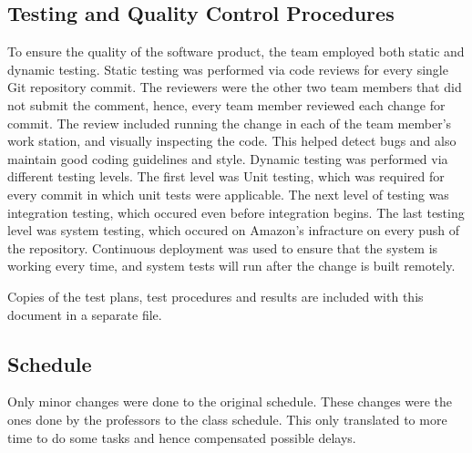\subsection{Testing and Quality Control Procedures}

To ensure the quality of the software product, the team employed both static
and dynamic testing. Static testing was performed via code reviews for every
single Git repository commit. The reviewers were the other two team members
that did not submit the comment, hence, every team member reviewed each change
for commit. The review included running the change in each of the team
member's work station, and visually inspecting the code. This helped detect
bugs and also maintain good coding guidelines and style. Dynamic testing was
performed via different testing levels. The first level was Unit testing,
which was required for every commit in which unit tests were applicable. The next level of testing was integration testing, which occured even before integration begins. The last testing level was system
testing, which occured on Amazon's infracture on every push of the
repository. Continuous deployment was used to ensure
that the system is working every time, and system tests will run after the
change is built remotely.

Copies of the test plans, test procedures and results are included with this document in a separate file.

\subsection{Schedule}

Only minor changes were done to the original schedule. These changes were the ones done by the professors to the class schedule. This only translated to more time to do some tasks and hence compensated possible delays.